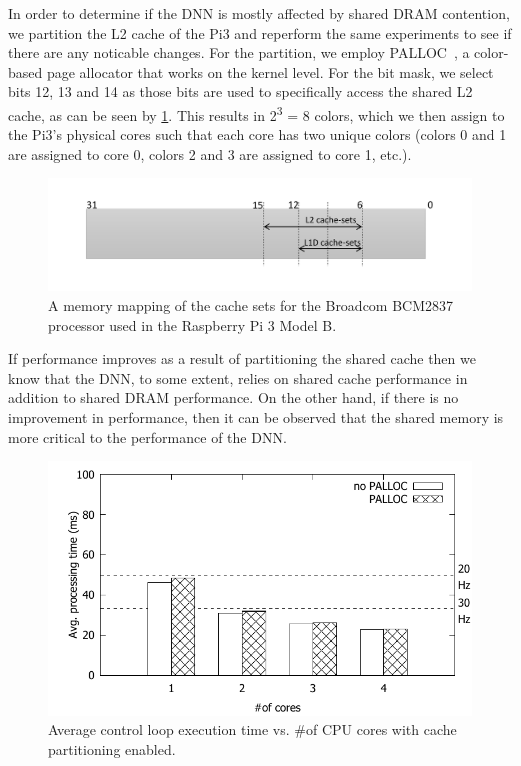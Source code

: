 In order to determine if the DNN is mostly affected by shared DRAM 
contention, we partition the L2 cache of the Pi3 and reperform the 
same experiments to see if there are any noticable changes. For the 
partition, we employ PALLOC~\cite{yun2014rtas}, a color-based page 
allocator that works on the kernel level. For the bit mask, we select 
bits 12, 13 and 14 as those bits are used to specifically access the 
shared L2 cache, as can be seen by \ref{fig:cache-mapping}. This 
results in 2\textsuperscript{3} = 8 colors, which we then assign to the Pi3's 
physical cores such that each core has two unique colors (colors 0 
and 1 are assigned to core 0, colors 2 and 3 are assigned to core 1, 
etc.).

\begin{figure}[h]
  \centering
  \includegraphics[width=\textwidth]{figs/cache-mapping}
  \caption{A memory mapping of the cache sets for the Broadcom 
BCM2837 processor used in the Raspberry Pi 3 Model B.}
  \label{fig:cache-mapping}
\end{figure}

If performance improves as a result of partitioning the shared cache 
then we know that the DNN, to some extent, relies on shared cache 
performance in addition to shared DRAM performance. On the other 
hand, if there is no improvement in performance, then it can be 
observed that the shared memory is more critical to the performance 
of the DNN.

\begin{figure}[h]
  \centering
  \includegraphics[width=.7\textwidth]{figs/palloc_multicore}
  \caption{Average control loop execution time vs. \#of CPU
    cores with cache partitioning enabled.}
  \label{fig:palloc_multicore}
\end{figure}

